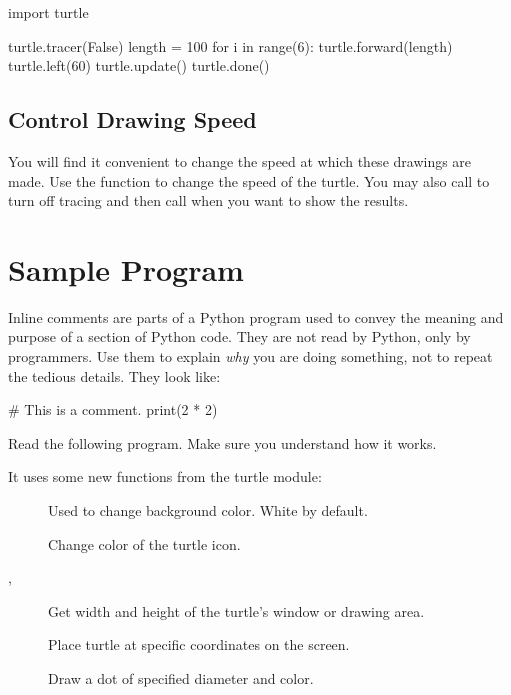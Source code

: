 \documentclass[11pt]{cselabheader}
\begin{document}
\begin{python3code}
import turtle

turtle.tracer(False)
length = 100
for i in range(6):
    turtle.forward(length)
    turtle.left(60)
turtle.update()
turtle.done()
\end{python3code}

\subsection{Control Drawing Speed}
You will find it convenient to change the speed at which
these drawings are made. Use the 
function to change the speed of the turtle.
You may also call 
to turn off tracing and then call 
when you want to show the results.

\newpage
\section{Sample Program}

Inline comments are parts of a Python program used to convey
the meaning and purpose of a section of Python code.
They are not read by Python, only by programmers.
Use them to explain \emph{why} you are doing something, not to
repeat the tedious details. They look like:

\begin{python3code}
# This is a comment.
print(2 * 2)
\end{python3code}

Read the following program. Make sure you understand how it works.

It uses some new functions from the turtle module:
\begin{description}
\item
  [\protect{}] Used to change background color. White by default.
\item
  [\protect{}] Change color of the turtle icon.
\item
  [\protect{}, \protect{}]
  Get width and height of the turtle's window or drawing area.
\item
  [\protect{}] Place turtle at specific coordinates on the screen.
\item
  [\protect{}] Draw a dot of specified diameter and color.
\end{description}
\end{document}
